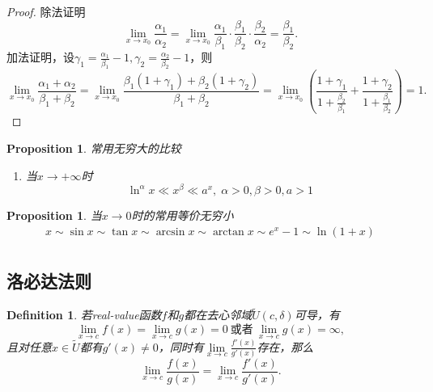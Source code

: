 \documentclass{article}
\newtheorem{proposition}[theorem]{Proposition}
\newtheorem{definition}[theorem]{Definition}
\begin{document}
\begin{proof}
除法证明
$$
\lim\limits_{x \rightarrow x_0} \frac{\alpha_1}{\alpha_2}= \lim\limits_{x \rightarrow x_0} \frac{\alpha_1}{\beta_1} \cdot \frac{\beta_1}{\beta_2} \cdot \frac{\beta_2}{\alpha_2} = \frac{\beta_1}{\beta_2}. 
$$
加法证明，设$\gamma_1 = \frac{\alpha_1}{\beta_1} - 1,\gamma_2 = \frac{\alpha_2}{\beta_2} - 1$，则
$$
\lim\limits_{x \rightarrow x_0} \frac{\alpha_1+\alpha_2}{\beta_1 + \beta_2} = \lim\limits_{x \rightarrow x_0} \frac{\beta_1(1+\gamma_1) + \beta_2(1+\gamma_2)}{\beta_1 + \beta_2} = \lim\limits_{x \rightarrow x_0} \left( \frac{1+\gamma_1}{1+\frac{\beta_2}{\beta_1}} + \frac{1+\gamma_2}{1+\frac{\beta_1}{\beta_2}} \right) = 1. 
$$
\end{proof}

\begin{proposition}
\rm  {\color{red} 常用无穷大的比较}
\begin{enumerate}
	\item 当$x \rightarrow +\infty$时
	$$
		\ln^\alpha x \ll x^\beta \ll a^x, \;\alpha > 0 ,\beta > 0,a > 1 
	$$
\end{enumerate}
\end{proposition}

\begin{proposition}
\rm 当$x \to 0$时的常用等价无穷小
$$
\begin{array}{ll}
x \sim \sin x \sim \tan x \sim \arcsin x \sim \arctan x \sim e^x-1 \sim \ln(1+x) \\
\end{array}
$$
\end{proposition}

\subsection{洛必达法则}

\begin{definition}
\rm 若real-value函数$f$和$g$都在去心邻域$\tilde{U}(c,\delta)$可导，有
$$
\lim\limits_{x \rightarrow c} f(x) = \lim\limits_{x \rightarrow c} g(x) = 0 ~\text{或者}~ \lim\limits_{x \rightarrow c} g(x) = \infty,
$$
且对任意$x \in \tilde{U}$都有$g'(x) \neq 0$，同时有$\lim\limits_{x \rightarrow c}\frac{f'(x)}{g'(x)}$存在，那么
$$
\lim\limits_{x \rightarrow c} \frac{f(x)}{g(x)} = \lim\limits_{x \rightarrow c} \frac{f'(x)}{g'(x)}.
$$
\end{definition}
\end{document}
